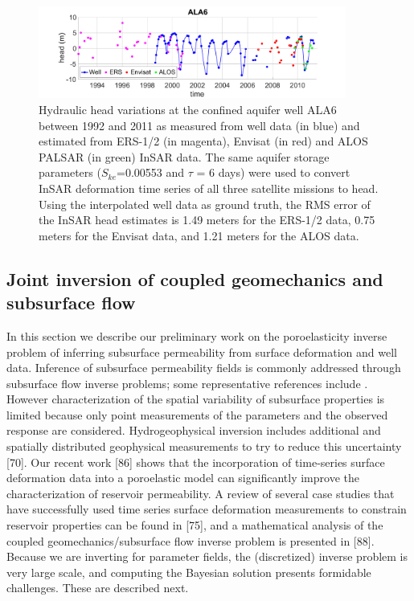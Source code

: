 \documentclass[11pt,final]{article}%
\renewcommand{\citep}{\cite}
\begin{document}
\begin{figure}
\noindent\includegraphics[width=0.9\textwidth]{Figures/ALA6.pdf}
\caption{Hydraulic head variations at the confined aquifer well ALA6 between 1992 and 2011 as measured from well data (in blue) and estimated from ERS-1/2 (in magenta), Envisat (in red) and ALOS PALSAR (in green) InSAR data. The same aquifer storage parameters ($S_{ke}$=0.00553 and $\tau$ = 6 days) were used to convert InSAR deformation time series of all three satellite missions to head. Using the interpolated well data as ground truth, the RMS error of the InSAR head estimates is 1.49 meters for the ERS-1/2 data, 0.75 meters for the Envisat data, and 1.21 meters for the ALOS data.}
\label{fig:ALA6}
\end{figure}

\subsection{Joint inversion of coupled geomechanics and subsurface flow}
In this section we describe our preliminary work on the poroelasticity inverse problem of inferring subsurface permeability from surface deformation and well data. Inference of subsurface permeability fields is commonly addressed through
subsurface flow inverse problems; some representative references include \citep{Carrera1986a,Carrera1986b,Carrera1986c,McLaughlin1996,Bohling2010,Cardiff2011,Cardiff2012,Berg2015,Yoon2017}. 
However characterization of the spatial variability of subsurface properties is limited because only point measurements of the parameters and the observed response are considered. Hydrogeophysical inversion includes additional and spatially distributed geophysical measurements to try to reduce this
uncertainty [70]. Our recent work [86] shows that the incorporation of time-series surface deformation data into a poroelastic model can significantly improve the characterization of reservoir permeability. A review of several case studies that have successfully used time series surface deformation measurements
to constrain reservoir properties can be found in [75], and a mathematical analysis of the coupled geomechanics/subsurface flow inverse problem is presented in [88]. Because we are inverting for parameter fields, the (discretized) inverse problem is very large scale, and computing the Bayesian solution presents formidable challenges. These are described next.
\end{document}

